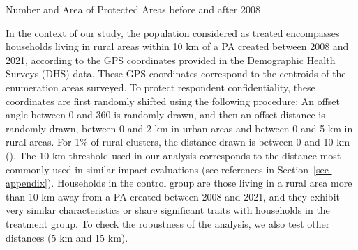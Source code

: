 \documentclass[
]{article}
\begin{document}
\begin{table}

\caption{\label{tbl-tab:protected_areas}Number and Area of Protected Areas before and after 2008}


\end{table}%

In the context of our study, the population considered as treated
encompasses households living in rural areas within 10 km of a PA
created between 2008 and 2021, according to the GPS coordinates provided
in the Demographic Health Surveys (DHS) data. These GPS coordinates
correspond to the centroids of the enumeration areas surveyed. To
protect respondent confidentiality, these coordinates are first randomly
shifted using the following procedure: An offset angle between 0 and 360
is randomly drawn, and then an offset distance is randomly drawn,
between 0 and 2 km in urban areas and between 0 and 5 km in rural areas.
For 1\% of rural clusters, the distance drawn is between 0 and 10 km
(). The 10
km threshold used in our analysis corresponds to the distance most
commonly used in similar impact evaluations (see references in
Section~\ref{sec-appendix}). Households in the control group are those
living in a rural area more than 10 km away from a PA created between
2008 and 2021, and they exhibit very similar characteristics or share
significant traits with households in the treatment group. To check the
robustness of the analysis, we also test other distances (5 km and 15
km).
\end{document}
